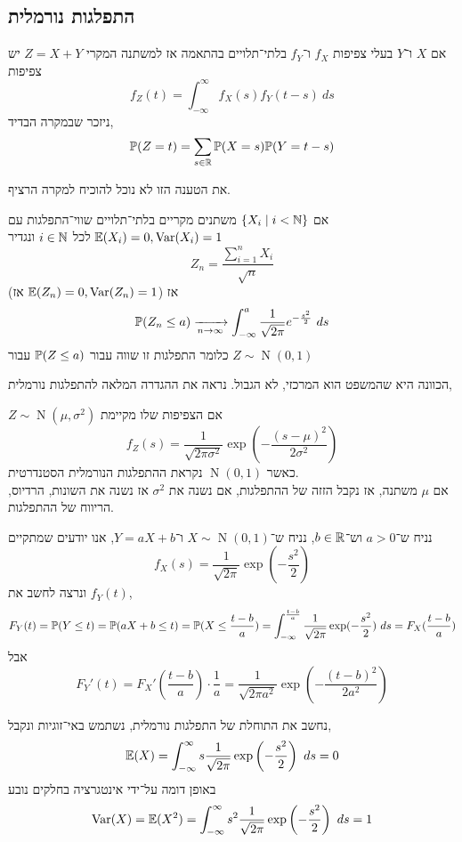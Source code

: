 \subsection{התפלגות נורמלית}
\begin{proposition}
	אם $X$ ו־$Y$ בעלי צפיפות $f_X$ ו־$f_Y$ בלתי־תלויים בהתאמה אז למשתנה המקרי $Z = X + Y$ יש צפיפות
	\[
		f_Z(t)
		= \int_{-\infty}^{\infty} f_X(s) f_Y(t - s)\ ds
	\]
	ניזכר שבמקרה הבדיד,
	\[
		\mathbb{P}(Z = t)
		= \sum_{s \in \mathbb{R}} \mathbb{P}(X = s) \mathbb{P}(Y = t - s)
	\]
\end{proposition}
את הטענה הזו לא נוכל להוכיח למקרה הרציף.
\begin{theorem}\label{central_limit_theorem}
	אם $\{ X_i \mid i < \mathbb{N} \}$ משתנים מקריים בלתי־תלויים שווי־התפלגות עם $\mathbb{E}(X_i) = 0, \operatorname{Var}(X_i) = 1$ לכל $i \in \mathbb{N}$ ונגדיר
	\[
		Z_n = \frac{\sum_{i = 1}^{n} X_i}{\sqrt{n}}
	\]
	(אז $\mathbb{E}(Z_n) = 0, \operatorname{Var}(Z_n) = 1$)
	אז
	\[
		\mathbb{P}(Z_n \le a) \xrightarrow[n \to \infty]{} \int_{-\infty}^{a} \frac{1}{\sqrt{2\pi}} e^{-\frac{s^2}{2}}\ ds
	\]
	כלומר התפלגות זו שווה עבור $\mathbb{P}(Z \le a)$ עבור $Z \sim \operatorname{N}(0, 1)$
\end{theorem}
הכוונה היא שהמשפט הוא המרכזי, לא הגבול.
נראה את ההגדרה המלאה להתפלגות נורמלית,
\begin{definition}
	$Z \sim \operatorname{N}(\mu, \sigma^2)$ אם הצפיפות שלו מקיימת
	\[
		f_Z(s) = \frac{1}{\sqrt{2\pi \sigma^2}} \exp\left(-\frac{{(s - \mu)}^2}{2\sigma^2}\right)
	\]
	כאשר $\operatorname{N}(0, 1)$ נקראת ההתפלגות הנורמלית הסטנדרטית. \\
	אם $\mu$ משתנה, אז נקבל הזזה של ההתפלגות, אם נשנה את $\sigma^2$ אז נשנה את השונות, הרדיוס, הריווח של ההתפלגות.
\end{definition}
\begin{example}
	נניח ש־$a > 0$ וש־$b \in \mathbb{R}$, נניח ש־$X \sim \operatorname{N}(0, 1)$ ו־$Y = aX + b$, אנו יודעים שמתקיים
	\[
		f_X(s)
		= \frac{1}{\sqrt{2 \pi}} \exp(-\frac{s^2}{2})
	\]
	ונרצה לחשב את $f_Y(t)$,
	\[
		F_Y(t)
		= \mathbb{P}(Y \le t)
		= \mathbb{P}(aX + b \le t)
		= \mathbb{P}(X \le \frac{t - b}{a})
		= \int_{-\infty}^{\frac{t - b}{a}} \frac{1}{\sqrt{2 \pi}} \exp(-\frac{s^2}{2})\ ds
		= F_X(\frac{t - b}{a})
	\]
	אבל
	\[
		F_Y'(t)
		= F_X'\left(\frac{t - b}{a}\right) \cdot \frac{1}{a}
		= \frac{1}{\sqrt{2\pi a^2}} \exp\left(- \frac{{(t - b)}^2}{2a^2}\right)
	\]
\end{example}
\begin{example}
	נחשב את התוחלת של התפלגות נורמלית, נשתמש באי־זוגיות ונקבל,
	\[
		\mathbb{E}(X)
		= \int_{-\infty}^{\infty} s \frac{1}{\sqrt{2 \pi}} \exp\left(- \frac{s^2}{2}\right)\ ds
		= 0
	\]
	באופן דומה על־ידי אינטגרציה בחלקים נובע
	\[
		\operatorname{Var}(X)
		= \mathbb{E}(X^2)
		= \int_{-\infty}^{\infty} s^2 \frac{1}{\sqrt{2\pi}} \exp\left(- \frac{s^2}{2}\right)\ ds
		= 1
	\]
\end{example}
